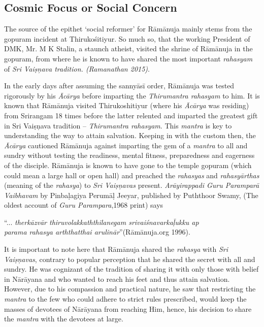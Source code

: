 \subsection*{Cosmic Focus or Social Concern}

The source of the epithet ‘social reformer’ for Rāmānuja mainly stems from the gopuram incident at Thirukośitiyur. So much so, that the working President of DMK, Mr. M K Stalin, a staunch atheist, visited the shrine of Rāmānuja in the gopuram, from where he is known to have shared the most important \textit{rahasyam} of \textit{Sri Vaiṣņava tradition. (Ramanathan 2015)}.

In the early days after assuming the sannyāsī order, Rāmānuja was tested rigorously by his \textit{Ācārya} before imparting the \textit{Thirumantra rahasyam} to him. It is known that Rāmānuja visited Thirukoshitiyur (where his \textit{Ācārya} was residing) from Srirangam 18 times before the latter relented and imparted the greatest gift in Sri Vaiṣņava tradition – \textit{Thirumantra rahasyam}. This \textit{mantra} is key to understanding the way to attain salvation. Keeping in with the custom then, the \textit{Ācārya} cautioned Rāmānuja against imparting the gem of a \textit{mantra} to all and sundry without testing the readiness, mental fitness, preparedness and eagerness of the disciple. Rāmānuja is known to have gone to the temple gopuram (which could mean a large hall or open hall) and preached the \textit{rahasyas} and \textit{rahasyārthas} (meaning of the \textit{rahasya}) to \textit{Sri Vaiṣņavas }present. \textit{Arāyirappadi Guru Paramparā Vaibhavam} by Pinbaḷagiya Perumāḷ Jeeyar, published by Puththoor Swamy, (The oldest account of \textit{Guru Parampara},1968 print) says

\begin{myquote}
“... \textit{therkāzvār thiruvolakkaththilanegam srivaiśnavarkaḹukku ap}\\\textit{parama rahasya arththatthai arulinār}”(Rāmānuja.org 1996).
\end{myquote}

It is important to note here that Rāmānuja shared the \textit{rahasya} with \textit{Sri Vaiṣņavas}, contrary to popular perception that he shared the secret with all and sundry. He was cognizant of the tradition of sharing it with only those with belief in Nārāyana and who wanted to reach his feet and thus attain salvation. However, due to his compassion and practical nature, he saw that restricting the \textit{mantra} to the few who could adhere to strict rules prescribed, would keep the masses of devotees of Nārāyana from reaching Him, hence, his decision to share the \textit{mantra }with the devotees at large.

